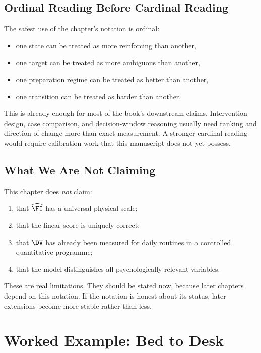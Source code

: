 \subsection{Ordinal Reading Before Cardinal Reading}

The safest use of the chapter's notation is ordinal:
\begin{itemize}[nosep]
  \item one state can be treated as more reinforcing than another,
  \item one target can be treated as more ambiguous than another,
  \item one preparation regime can be treated as better than another,
  \item one transition can be treated as harder than another.
\end{itemize}

This is already enough for most of the book's downstream claims. Intervention
design, case comparison, and decision-window reasoning usually need ranking and
direction of change more than exact measurement. A stronger cardinal reading
would require calibration work that this manuscript does not yet possess.

\subsection{What We Are Not Claiming}

This chapter does \emph{not} claim:
\begin{enumerate}[nosep]
  \item that $\widehat{\FI}$ has a universal physical scale;
  \item that the linear score is uniquely correct;
  \item that $\DV$ has already been measured for daily routines in a controlled
        quantitative programme;
  \item that the model distinguishes all psychologically relevant variables.
\end{enumerate}

These are real limitations. They should be stated now, because later chapters
depend on this notation. If the notation is honest about its status, later
extensions become more stable rather than less.

\section{Worked Example: Bed to Desk}

